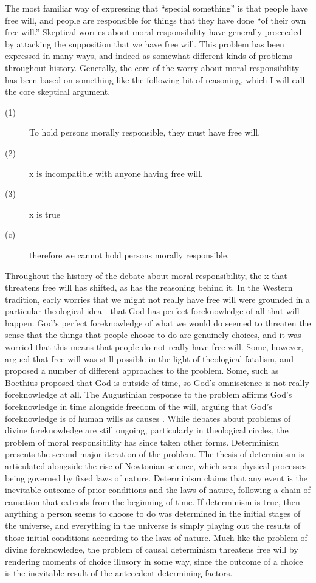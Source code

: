 \documentclass[phd,12pt,oneside,paper=letterpaper]{ubcthesis}
\begin{document}
The most familiar way of expressing that ``special something'' is that people have free will, and people are responsible for things that they have done ``of their own free will.'' Skeptical worries about moral responsibility have generally proceeded by attacking the supposition that we have free will. This problem has been expressed in many ways, and indeed as somewhat different kinds of problems throughout history. Generally, the core of the worry about moral responsibility has been based on something like the following bit of reasoning, which I will call the core skeptical argument. 

\begin{description}
\item[(1)] To hold persons morally responsible, they must have free will.
\item[(2)] x is incompatible with anyone having free will.
\item[(3)] x is true
\item[(c)] therefore we cannot hold persons morally responsible.
\end{description}

Throughout the history of the debate about moral responsibility, the x that threatens free will has shifted, as has the reasoning behind it. In the Western tradition, early worries that we might not really have free will were grounded in a particular theological idea - that God has perfect foreknowledge of all that will happen. God's perfect foreknowledge of what we would do seemed to threaten the sense that the things that people choose to do are genuinely choices, and it was worried that this means that people do not really have free will. Some, however, argued that free will was still possible in the light of theological fatalism, and proposed a number of different approaches to the problem. Some, such as Boethius \citeyearpar{boethius2008} proposed that God is outside of time, so God's omniscience is not really foreknowledge at all. The Augustinian response to the problem affirms God's foreknowledge in time alongside freedom of the will, arguing that God's foreknowledge is of human wills as causes \citep{augustine2010}. While debates about problems of divine foreknowledge are still ongoing, particularly in theological circles, the problem of moral responsibility has since taken other forms. 
Determinism presents the second major iteration of the problem. The thesis of determinism is articulated alongside the rise of Newtonian science, which sees physical processes being governed by fixed laws of nature. Determinism claims that any event is the inevitable outcome of prior conditions and the laws of nature, following a chain of causation that extends from the beginning of time. If determinism is true, then anything a person seems to choose to do was determined in the initial stages of the universe, and everything in the universe is simply playing out the results of those initial conditions according to the laws of nature. Much like the problem of divine foreknowledge, the problem of causal determinism threatens free will by rendering moments of choice illusory in some way, since the outcome of a choice is the inevitable result of the antecedent determining factors. 
\end{document}
